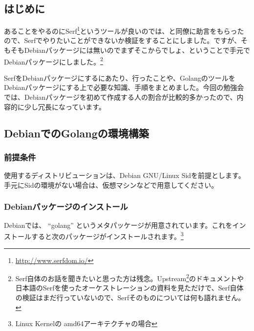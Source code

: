 \documentclass[mingoth,a4paper]{jsarticle}
\begin{document}
\subsection{はじめに}

あることをやるのにSerf\footnote{\url{http://www.serfdom.io/}}というツールが良いのでは、と同僚に助言をもらったので、Serfでやりたいことができないか検証をすることにしました。ですが、そもそもDebianパッケージには無いのでまずそこからでしょ、ということで手元でDebianパッケージにしました。\footnote{Serf自体のお話を聞きたいと思った方は残念。Upstream\footnote{\url{https://github.com/hashicorp/serf/}}のドキュメントや日本語のSerfを使ったオーケストレーションの資料を見ただけで、Serf自体の検証はまだ行っていないので、Serfそのものについては何も語れません。}

SerfをDebianパッケージにするにあたり、行ったことや、GolangのツールをDebianパッケージにする上で必要な知識、手順をまとめました。今回の勉強会では、Debianパッケージを初めて作成する人の割合が比較的多かったので、内容的に少し冗長になっています。

\subsection{DebianでのGolangの環境構築}

\subsubsection{前提条件}

使用するディストリビューションは、Debian GNU/Linux Sidを前提とします。手元にSidの環境がない場合は、仮想マシンなどで用意してください。

\subsubsection{Debianパッケージのインストール}

Debianでは、 ``golang'' というメタパッケージが用意されています。これをインストールすると次のパッケージがインストールされます。\footnote{Linux Kernelの amd64アーキテクチャの場合}
\end{document}
